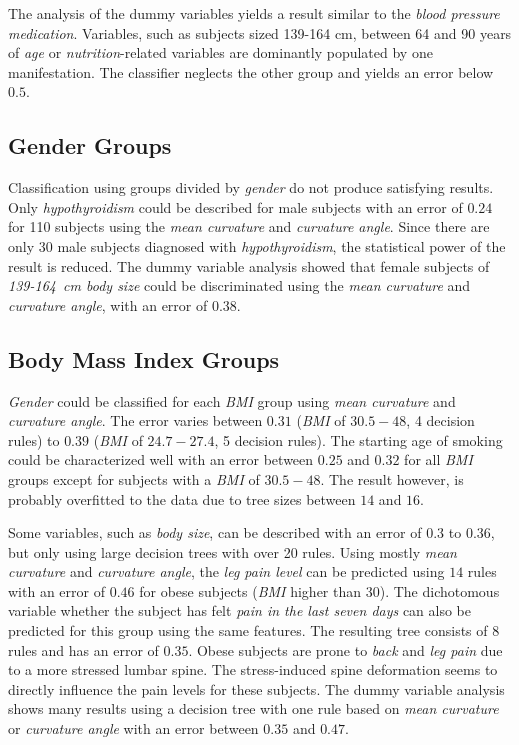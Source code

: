 \documentclass[a4paper,twoside]{style/article}
\begin{document}
The analysis of the dummy variables yields a result similar to the \emph{blood pressure medication}.
Variables, such as subjects sized 139-164 cm, between 64 and 90 years of \emph{age} or \emph{nutrition}-related variables are dominantly populated by one manifestation.
The classifier neglects the other group and yields an error below $0.5$.
\subsection{Gender Groups}
Classification using groups divided by \emph{gender} do not produce satisfying results.
Only \emph{hypothyroidism} could be described for male subjects with an error of $0.24$ for 110 subjects using the \emph{mean curvature} and \emph{curvature angle}.
Since there are only 30 male subjects diagnosed with \emph{hypothyroidism}, the statistical power of the result is reduced.
The dummy variable analysis showed that female subjects of \emph{139-164~cm body size} could be discriminated using the \emph{mean curvature} and \emph{curvature angle}, with an error of $0.38$.
\subsection{Body Mass Index Groups}
\emph{Gender} could be classified for each \emph{BMI} group using \emph{mean curvature} and \emph{curvature angle}.
The error varies between $0.31$ (\emph{BMI} of \emph{$30.5-48$}, 4 decision rules) to $0.39$ (\emph{BMI} of \emph{$24.7-27.4$}, 5 decision rules).
The starting age of smoking could be characterized well with an error between $0.25$ and $0.32$ for all \emph{BMI} groups except for subjects with a \emph{BMI} of \emph{$30.5-48$}.
The result however, is probably overfitted to the data due to tree sizes between $14$ and $16$.

Some variables, such as \emph{body size}, can be described with an error of $0.3$ to $0.36$, but only using large decision trees with over 20 rules.
Using mostly \emph{mean curvature} and \emph{curvature angle}, the \emph{leg pain level} can be predicted using $14$ rules with an error of $0.46$ for obese subjects (\emph{BMI} higher than $30$).
The dichotomous variable whether the subject has felt \emph{pain in the last seven days} can also be predicted for this group using the same features.
The resulting tree consists of $8$ rules and has an error of $0.35$.
Obese subjects are prone to \emph{back} and \emph{leg pain} due to a more stressed lumbar spine.
The stress-induced spine deformation seems to directly influence the pain levels for these subjects.
The dummy variable analysis shows many results using a decision tree with one rule based on \emph{mean curvature} or \emph{curvature angle} with an error between $0.35$ and $0.47$.
\end{document}
